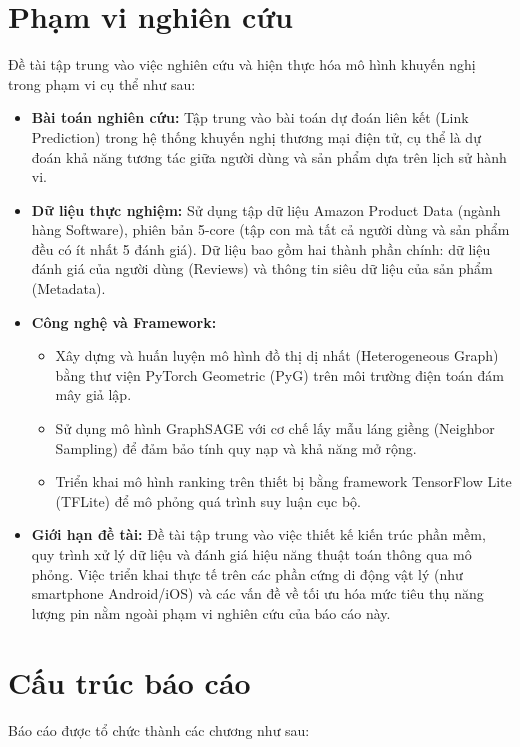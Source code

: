 \section{Phạm vi nghiên cứu}

Đề tài tập trung vào việc nghiên cứu và hiện thực hóa mô hình khuyến nghị trong phạm vi cụ thể như sau:

\begin{itemize}
    \item \textbf{Bài toán nghiên cứu:} Tập trung vào bài toán dự đoán liên kết (Link Prediction) trong hệ thống khuyến nghị thương mại điện tử, cụ thể là dự đoán khả năng tương tác giữa người dùng và sản phẩm dựa trên lịch sử hành vi.
    \item \textbf{Dữ liệu thực nghiệm:} Sử dụng tập dữ liệu Amazon Product Data (ngành hàng Software), phiên bản 5-core (tập con mà tất cả người dùng và sản phẩm đều có ít nhất 5 đánh giá). Dữ liệu bao gồm hai thành phần chính: dữ liệu đánh giá của người dùng (Reviews) và thông tin siêu dữ liệu của sản phẩm (Metadata).
    \item \textbf{Công nghệ và Framework:}
    \begin{itemize}
        \item Xây dựng và huấn luyện mô hình đồ thị dị nhất (Heterogeneous Graph) bằng thư viện PyTorch Geometric (PyG) trên môi trường điện toán đám mây giả lập.
        \item Sử dụng mô hình GraphSAGE với cơ chế lấy mẫu láng giềng (Neighbor Sampling) để đảm bảo tính quy nạp và khả năng mở rộng.
        \item Triển khai mô hình ranking trên thiết bị bằng framework TensorFlow Lite (TFLite) để mô phỏng quá trình suy luận cục bộ.
    \end{itemize}
    \item \textbf{Giới hạn đề tài:} Đề tài tập trung vào việc thiết kế kiến trúc phần mềm, quy trình xử lý dữ liệu và đánh giá hiệu năng thuật toán thông qua mô phỏng. Việc triển khai thực tế trên các phần cứng di động vật lý (như smartphone Android/iOS) và các vấn đề về tối ưu hóa mức tiêu thụ năng lượng pin nằm ngoài phạm vi nghiên cứu của báo cáo này.
\end{itemize}

\section{Cấu trúc báo cáo}
Báo cáo được tổ chức thành các chương như sau:

